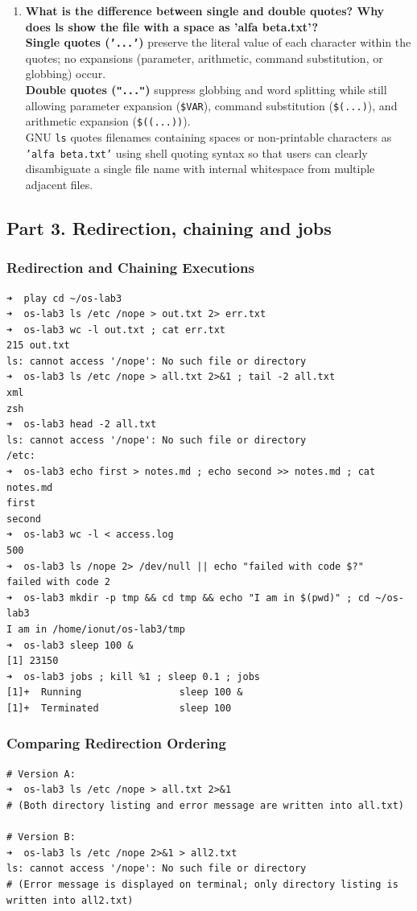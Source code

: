 \documentclass{labreport}
\begin{document}
\begin{enumerate}[leftmargin=*]
    \item \textbf{What is the difference between single and double quotes? Why does ls show the file with a space as 'alfa beta.txt'?}\\[0.2em]
    \textbf{Single quotes (\texttt{'...'})} preserve the literal value of each character within the quotes; no expansions (parameter, arithmetic, command substitution, or globbing) occur.\\
    \textbf{Double quotes (\texttt{"..."})} suppress globbing and word splitting while still allowing parameter expansion (\texttt{\$VAR}), command substitution (\texttt{\$(...)}), and arithmetic expansion (\texttt{\$((...))}).\\
    GNU \texttt{ls} quotes filenames containing spaces or non-printable characters as \texttt{'alfa beta.txt'} using shell quoting syntax so that users can clearly disambiguate a single file name with internal whitespace from multiple adjacent files.
\end{enumerate}

\subsection{Part 3. Redirection, chaining and jobs}

\subsubsection{Redirection and Chaining Executions}
\begin{lstlisting}[style=bash]
➜  play cd ~/os-lab3
➜  os-lab3 ls /etc /nope > out.txt 2> err.txt
➜  os-lab3 wc -l out.txt ; cat err.txt
215 out.txt
ls: cannot access '/nope': No such file or directory
➜  os-lab3 ls /etc /nope > all.txt 2>&1 ; tail -2 all.txt
xml
zsh
➜  os-lab3 head -2 all.txt
ls: cannot access '/nope': No such file or directory
/etc:
➜  os-lab3 echo first > notes.md ; echo second >> notes.md ; cat notes.md
first
second
➜  os-lab3 wc -l < access.log
500
➜  os-lab3 ls /nope 2> /dev/null || echo "failed with code $?"
failed with code 2
➜  os-lab3 mkdir -p tmp && cd tmp && echo "I am in $(pwd)" ; cd ~/os-lab3
I am in /home/ionut/os-lab3/tmp
➜  os-lab3 sleep 100 &
[1] 23150
➜  os-lab3 jobs ; kill %1 ; sleep 0.1 ; jobs
[1]+  Running                 sleep 100 &
[1]+  Terminated              sleep 100
\end{lstlisting}

\subsubsection{Comparing Redirection Ordering}
\begin{lstlisting}[style=bash]
# Version A:
➜  os-lab3 ls /etc /nope > all.txt 2>&1
# (Both directory listing and error message are written into all.txt)

# Version B:
➜  os-lab3 ls /etc /nope 2>&1 > all2.txt
ls: cannot access '/nope': No such file or directory
# (Error message is displayed on terminal; only directory listing is written into all2.txt)
\end{lstlisting}
\end{document}
